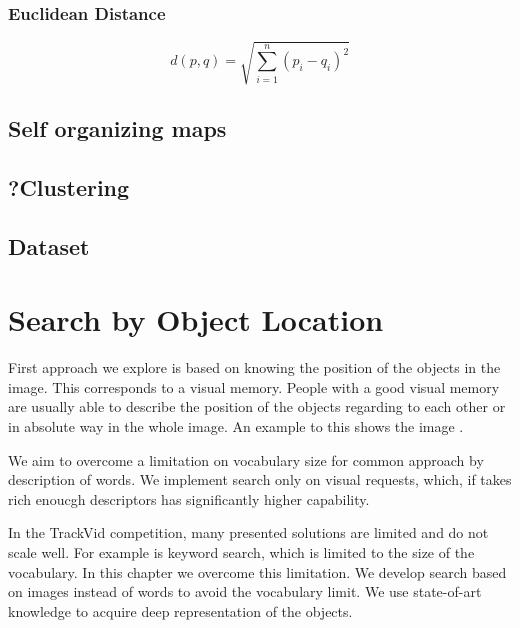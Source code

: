 \subsection{Euclidean Distance}
\begin{equation}
d(p, q) = \sqrt{\sum_{i=1}^n (p_i - q_i)^2}    
\end{equation}

\section{Self organizing maps}

\section{?Clustering}

\section{Dataset}

\chapter{Search by Object Location}

First approach we explore is based on knowing the position of the objects in the image. This corresponds to a visual memory. People with a good visual memory are usually able to describe the position of the objects regarding to each other or in absolute way in the whole image. An example to this shows the image \todo[]{}.

We aim to overcome a limitation on vocabulary size for common approach by description of words. We implement search only on visual requests, which, if takes rich enoucgh descriptors has significantly higher capability.


In the TrackVid competition, many presented solutions are limited and do not scale well. For example is keyword search, which is limited to the size of the vocabulary. In this chapter we overcome this limitation. We develop search based on images instead of words to avoid the vocabulary limit. We use state-of-art knowledge to acquire deep representation of the objects.

